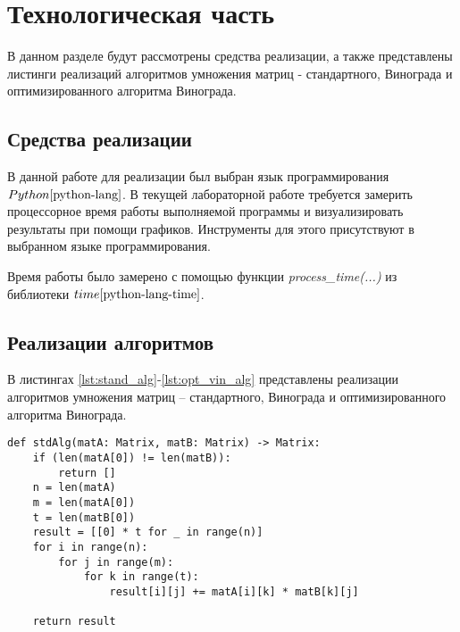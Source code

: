 \chapter{Технологическая часть}

В данном разделе будут рассмотрены средства реализации, а также представлены листинги реализаций алгоритмов умножения матриц - стандартного, Винограда и оптимизированного алгоритма Винограда.

\section{Средства реализации}
В данной работе для реализации был выбран язык программирования $Python \cite{python-lang}$. В текущей лабораторной работе требуется замерить процессорное время работы выполняемой программы и визуализировать результаты при помощи графиков. Инструменты для этого присутствуют в выбранном языке программирования.

Время работы было замерено с помощью функции \textit{process\_time(...)} из библиотеки $time \cite{python-lang-time}$.


\section{Реализации алгоритмов}

В листингах \ref{lst:stand_alg}-\ref{lst:opt_vin_alg} представлены реализации алгоритмов умножения матриц -- стандартного, Винограда и оптимизированного алгоритма Винограда.

\begin{center}
    \captionsetup{justification=raggedright,singlelinecheck=off}
    \begin{lstlisting}[label=lst:stand_alg,caption=Стандартный алгоритм умножения матриц]
def stdAlg(matA: Matrix, matB: Matrix) -> Matrix:
	if (len(matA[0]) != len(matB)):
		return []
	n = len(matA)
	m = len(matA[0])
	t = len(matB[0])
	result = [[0] * t for _ in range(n)]
	for i in range(n):
		for j in range(m):
			for k in range(t):
				result[i][j] += matA[i][k] * matB[k][j]
	
	return result
\end{lstlisting}
\end{center}


